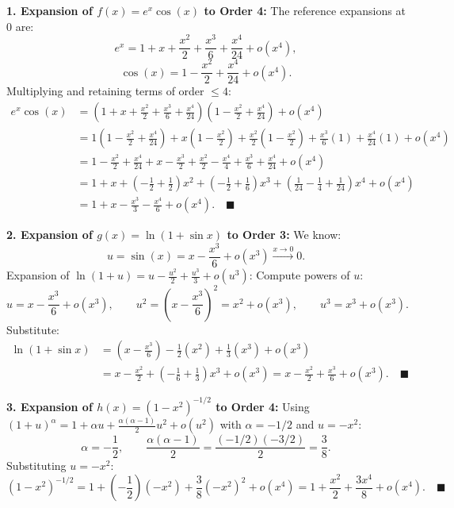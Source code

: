 \begin{tabletworkspace}[5.0cm]
\end{tabletworkspace}

\begin{solution}
\textbf{1. Expansion of $f(x) = e^x \cos(x)$ to Order 4:}
The reference expansions at $0$ are:
\[
e^x = 1 + x + \frac{x^2}{2} + \frac{x^3}{6} + \frac{x^4}{24} + o(x^4),
\]
\[
\cos(x) = 1 - \frac{x^2}{2} + \frac{x^4}{24} + o(x^4).
\]
Multiplying and retaining terms of order $\le 4$:
\begin{align*}
e^x \cos(x) &= \left( 1 + x + \frac{x^2}{2} + \frac{x^3}{6} + \frac{x^4}{24} \right) \left( 1 - \frac{x^2}{2} + \frac{x^4}{24} \right) + o(x^4) \\
&= 1\left(1 - \frac{x^2}{2} + \frac{x^4}{24}\right) + x\left(1 - \frac{x^2}{2}\right) + \frac{x^2}{2}\left(1 - \frac{x^2}{2}\right) + \frac{x^3}{6}(1) + \frac{x^4}{24}(1) + o(x^4) \\
&= 1 - \frac{x^2}{2} + \frac{x^4}{24} + x - \frac{x^3}{2} + \frac{x^2}{2} - \frac{x^4}{4} + \frac{x^3}{6} + \frac{x^4}{24} + o(x^4) \\
&= 1 + x + \left(-\frac{1}{2} + \frac{1}{2}\right)x^2 + \left(-\frac{1}{2} + \frac{1}{6}\right)x^3 + \left(\frac{1}{24} - \frac{1}{4} + \frac{1}{24}\right)x^4 + o(x^4) \\
&= 1 + x - \frac{x^3}{3} - \frac{x^4}{6} + o(x^4). \quad \blacksquare
\end{align*}

\textbf{2. Expansion of $g(x) = \ln(1 + \sin x)$ to Order 3:}
We know:
\[
u = \sin(x) = x - \frac{x^3}{6} + o(x^3) \xrightarrow{x \to 0} 0.
\]
Expansion of $\ln(1 + u) = u - \frac{u^2}{2} + \frac{u^3}{3} + o(u^3)$:
Compute powers of $u$:
\[
u = x - \frac{x^3}{6} + o(x^3), \qquad u^2 = \left(x - \frac{x^3}{6}\right)^2 = x^2 + o(x^3), \qquad u^3 = x^3 + o(x^3).
\]
Substitute:
\begin{align*}
\ln(1 + \sin x) &= \left(x - \frac{x^3}{6}\right) - \frac{1}{2}\left(x^2\right) + \frac{1}{3}\left(x^3\right) + o(x^3) \\
&= x - \frac{x^2}{2} + \left(-\frac{1}{6} + \frac{1}{3}\right)x^3 + o(x^3) = x - \frac{x^2}{2} + \frac{x^3}{6} + o(x^3). \quad \blacksquare
\end{align*}

\textbf{3. Expansion of $h(x) = (1 - x^2)^{-1/2}$ to Order 4:}
Using $(1 + u)^\alpha = 1 + \alpha u + \frac{\alpha(\alpha - 1)}{2} u^2 + o(u^2)$ with $\alpha = -1/2$ and $u = -x^2$:
\[
\alpha = -\frac{1}{2}, \qquad \frac{\alpha(\alpha - 1)}{2} = \frac{(-1/2)(-3/2)}{2} = \frac{3}{8}.
\]
Substituting $u = -x^2$:
\[
(1 - x^2)^{-1/2} = 1 + \left(-\frac{1}{2}\right)(-x^2) + \frac{3}{8}(-x^2)^2 + o(x^4) = 1 + \frac{x^2}{2} + \frac{3x^4}{8} + o(x^4). \quad \blacksquare
\]
\end{solution}

